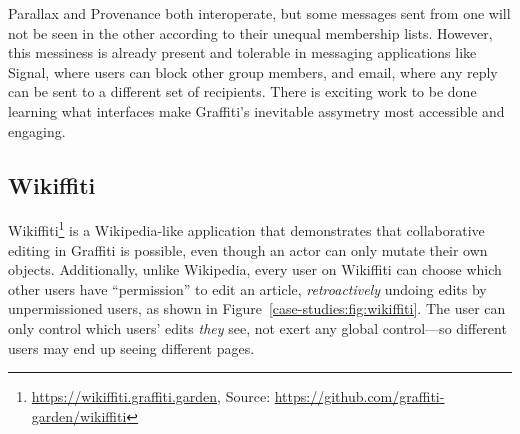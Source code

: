 
Parallax and Provenance both interoperate,
but some messages sent from one will not be seen in the other
according to their unequal membership lists. However, this messiness is already present and tolerable
in messaging applications like Signal, where users can block other group members,
and email, where any reply can be sent to a different set of recipients.
There is exciting work to be done learning what interfaces make
Graffiti's inevitable assymetry most accessible and engaging.




\subsection{Wikiffiti}

Wikiffiti\footnote{
\url{https://wikiffiti.graffiti.garden}, Source: \url{https://github.com/graffiti-garden/wikiffiti}
} is a Wikipedia-like application that demonstrates that
collaborative editing in Graffiti is possible,
even though an actor can only mutate their own objects.
Additionally, unlike Wikipedia,
every user on Wikiffiti can choose which other users have ``permission'' to edit an article,
\emph{retroactively} undoing edits by unpermissioned users,
as shown in Figure~\ref{case-studies:fig:wikiffiti}.
The user can only control which users' edits \emph{they} see, not exert any global control---so different users may end up seeing different pages.

